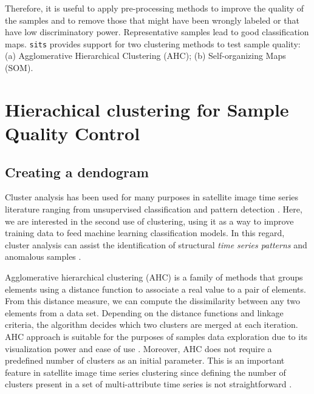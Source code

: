 \documentclass[a4paper,]{tufte-book}
\begin{document}
Therefore, it is useful to apply pre-processing methods to improve the quality of the samples and to remove those that might have been wrongly labeled or that have low discriminatory power. Representative samples lead to good classification maps. \texttt{sits} provides support for two clustering methods to test sample quality: (a) Agglomerative Hierarchical Clustering (AHC); (b) Self-organizing Maps (SOM).

\hypertarget{hierachical-clustering-for-sample-quality-control}{%
\section{Hierachical clustering for Sample Quality Control}\label{hierachical-clustering-for-sample-quality-control}}

\hypertarget{creating-a-dendogram}{%
\subsection{Creating a dendogram}\label{creating-a-dendogram}}

Cluster analysis has been used for many purposes in satellite image time series literature ranging from unsupervised classification and pattern detection \citep{Petitjean2011}. Here, we are interested in the second use of clustering, using it as a way to improve training data to feed machine learning classification models. In this regard, cluster analysis can assist the identification of structural \emph{time series patterns} and anomalous samples \citep{Frenay2014}.

Agglomerative hierarchical clustering (AHC) is a family of methods that groups elements using a distance function to associate a real value to a pair of elements. From this distance measure, we can compute the dissimilarity between any two elements from a data set. Depending on the distance functions and linkage criteria, the algorithm decides which two clusters are merged at each iteration. AHC approach is suitable for the purposes of samples data exploration due to its visualization power and ease of use \citep{Keogh2003}. Moreover, AHC does not require a predefined number of clusters as an initial parameter. This is an important feature in satellite image time series clustering since defining the number of clusters present in a set of multi-attribute time series is not straightforward \citep{Aghabozorgi2015}.
\end{document}
